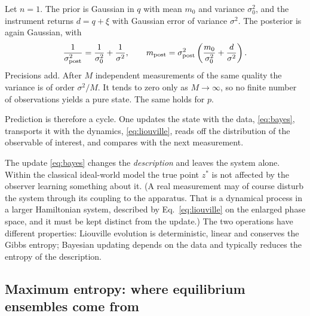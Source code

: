 \begin{example}\label{ex:bayes}
Let $n=1$. The prior is Gaussian in $q$ with mean $m_0$ and variance $\sigma_0^2$, and the instrument returns $d=q+\xi$ with Gaussian error of variance $\sigma^2$. The posterior is again Gaussian, with
\begin{equation}
\frac1{\sigma_{\rm post}^2}=\frac1{\sigma_0^2}+\frac1{\sigma^2},\qquad
m_{\rm post}=\sigma_{\rm post}^2\left(\frac{m_0}{\sigma_0^2}+\frac d{\sigma^2}\right).
\end{equation}
Precisions add. After $M$ independent measurements of the same quality the variance is of order $\sigma^2/M$. It tends to zero only as $M\to\infty$, so no finite number of observations yields a pure state. The same holds for $p$.
\end{example}

Prediction is therefore a cycle. One updates the state with the data, \eqref{eq:bayes}, transports it with the dynamics, \eqref{eq:liouville}, reads off the distribution of the observable of interest, and compares with the next measurement.

\begin{remark}
The update \eqref{eq:bayes} changes the \emph{description} and leaves the system alone. Within the classical ideal-world model the true point $z^*$ is not affected by the observer learning something about it. (A real measurement may of course disturb the system through its coupling to the apparatus. That is a dynamical process in a larger Hamiltonian system, described by Eq.~\eqref{eq:liouville} on the enlarged phase space, and it must be kept distinct from the update.) The two operations have different properties: Liouville evolution is deterministic, linear and conserves the Gibbs entropy; Bayesian updating depends on the data and typically reduces the entropy of the description.
\end{remark}

\subsection{Maximum entropy: where equilibrium ensembles come from}

